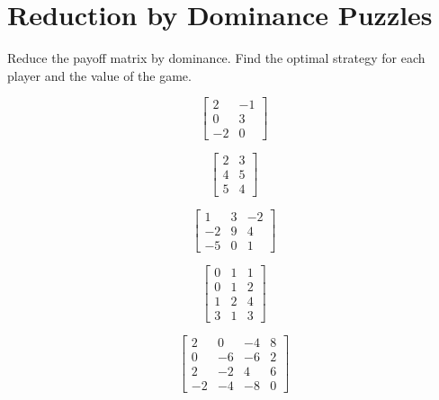 \section{Reduction by Dominance Puzzles}

Reduce the payoff matrix by dominance. Find the optimal strategy for each player and the value of the game.

\begin{puzzle}
    \[
        \begin{bmatrix}
            2  & -1 \\
            0  & 3  \\
            -2 & 0
        \end{bmatrix}
    \]
\end{puzzle}

\begin{puzzle}
    \[
        \begin{bmatrix}
            2 & 3 \\
            4 & 5 \\
            5 & 4
        \end{bmatrix}
    \]
\end{puzzle}

\begin{puzzle}
    \[
        \begin{bmatrix}
            1  & 3 & -2 \\
            -2 & 9 & 4  \\
            -5 & 0 & 1
        \end{bmatrix}
    \]
\end{puzzle}

\begin{puzzle}
    \[
        \begin{bmatrix}
            0 & 1 & 1 \\
            0 & 1 & 2 \\
            1 & 2 & 4 \\
            3 & 1 & 3
        \end{bmatrix}
    \]
\end{puzzle}

\begin{puzzle}
    \[
        \begin{bmatrix}
            2  & 0  & -4 & 8 \\
            0  & -6 & -6 & 2 \\
            2  & -2 & 4  & 6 \\
            -2 & -4 & -8 & 0
        \end{bmatrix}
    \]
\end{puzzle}


